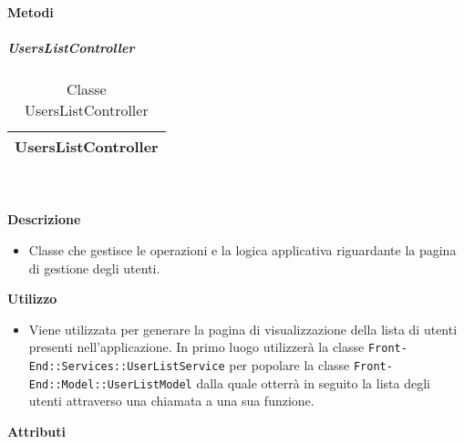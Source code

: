 		\textbf{Metodi} 
	\begin{itemize}
		\end{itemize}
			\subparagraph{UsersListController} 
\begin{table}[ht]
\begin{center}
\bgroup
	\setlength{\arrayrulewidth}{0.6mm}
	\def\arraystretch{1}
		\begin{tabular}{ | p{12cm} | }
				\hline  
					\centerline{\textbf{UsersListController}}
		\\ \hline 
				\hline
				\hline
		
		\end{tabular}
\egroup
\caption{Classe UsersListController}
\end{center}
\end{table}  \textbf{\\ \\ Descrizione} 
					\begin{itemize}
						\item[] Classe che gestisce le operazioni e la logica applicativa riguardante la pagina di gestione degli utenti.
					\end{itemize}      
				\textbf{Utilizzo}  
					\begin{itemize}
						\item[] Viene utilizzata per generare la pagina di visualizzazione della lista di utenti presenti nell'applicazione. In primo luogo utilizzerà la classe \texttt{Front-End::Services::UserListService} per popolare la classe \texttt{Front-End::Model::UserListModel} dalla quale otterrà in seguito la lista degli utenti attraverso una chiamata a una sua funzione.
					\end{itemize}
			 \textbf{Attributi} 
	\begin{itemize}
		\end{itemize}
		
